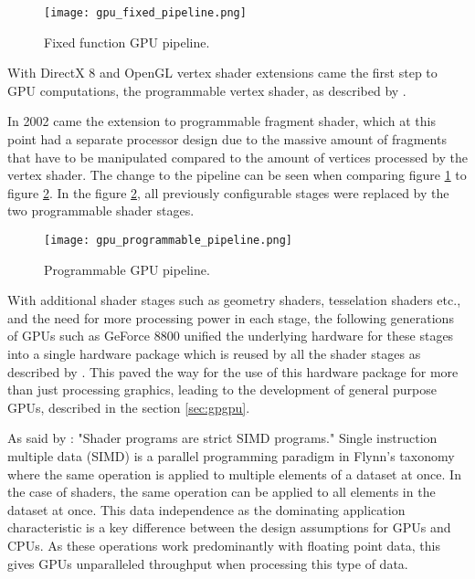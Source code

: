 \begin{figure}[h]
	\centering
	\texttt{[image: gpu\_fixed\_pipeline.png]}
	\caption{Fixed function GPU pipeline.}
	\label{fig:gpu_fixed_pipeline}
\end{figure}

With DirectX 8 and OpenGL vertex shader extensions  came the first step to GPU computations, the programmable vertex shader, as described by \citep[28]{book:paraproc}. 

In 2002 came the extension to programmable fragment shader, which at this point had a separate processor design due to the massive amount of fragments that have to be manipulated compared to the amount of vertices processed by the vertex shader. The change to the pipeline can be seen when comparing figure \ref{fig:gpu_fixed_pipeline} to figure \ref{fig:gpu_programmable_pipeline}. In the figure \ref{fig:gpu_programmable_pipeline}, all previously configurable stages were replaced by the two programmable shader stages.

\begin{figure}[h]
	\centering
	\texttt{[image: gpu\_programmable\_pipeline.png]}
	\caption{Programmable GPU pipeline.}
	\label{fig:gpu_programmable_pipeline}
\end{figure}

With additional shader stages such as geometry shaders, tesselation shaders etc., and the need for more processing power in each stage, the following generations of GPUs such as GeForce 8800 unified the underlying hardware for these stages into a single hardware package which is reused by all the shader stages as described by \citep[33]{book:paraproc}. This paved the way for the use of this hardware package for more than just processing graphics, leading to the development of general purpose GPUs, described in the section \ref{sec:gpgpu}. 

As said by \citep{paper:accelerator}: "Shader programs are strict SIMD programs." Single instruction multiple data (SIMD) is a parallel programming paradigm in Flynn's taxonomy where the same operation is applied to multiple elements of a dataset at once. In the case of shaders, the same operation can be applied to all elements in the dataset at once. This data independence as the dominating application characteristic is a key difference between the design assumptions for GPUs and CPUs. As these operations work predominantly with floating point data, this gives GPUs unparalleled throughput when processing this type of data.

